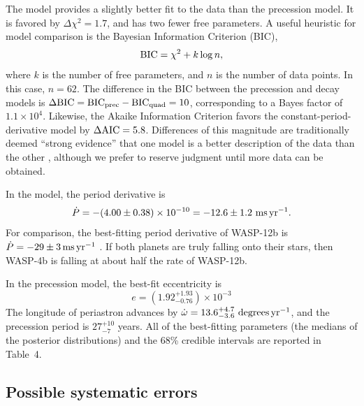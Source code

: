 \documentclass[12pt,twocolumn,tighten]{aastex62}
\begin{document}
{The  model provides a slightly
better fit to the data than the precession model.  It is favored by
$\Delta \chi^2 = 1.7$, and has two fewer free parameters.  A useful
heuristic for model comparison is the Bayesian Information Criterion
(BIC),
\begin{equation}
  {\rm BIC} = \chi^2 + k\log n,
\end{equation}
where $k$ is the number of free parameters, and $n$ is the number of
data points. In this case, $n=62$.  The difference in the BIC between
the precession and decay models is $\Delta {\rm BIC} = {\rm BIC}_{\rm
prec} - {\rm BIC}_{\rm quad} = 10$, corresponding to a Bayes factor of
$1.1\times 10^{4}$.  Likewise, the Akaike Information Criterion favors
the constant-period-derivative model by $\Delta {\rm AIC} = 5.8$.
Differences of this magnitude are traditionally deemed ``strong
evidence'' that one model is a better description of the data than the
other \citep{kass_bayes_1995}, although we prefer to reserve judgment
until more data can be obtained.

In the  model, the period
derivative is
\begin{equation}
\dot{P}
  = - (4.00 \pm 0.38)\times 10^{-10}
  = - 12.6 \pm 1.2~{\rm ms}\,{\rm yr}^{-1}.
  \label{eq:dP_dt_obs}
\end{equation}
For comparison, the best-fitting period derivative of WASP-12b is
$\dot{P} = -29 \pm 3\,{\rm ms}\,{\rm yr}^{-1}$
\citep{maciejewski_departure_2016,patra_2017}.  If both planets are
truly falling onto their stars, then WASP-4b is falling at about half
the rate of WASP-12b.

In the precession model, the best-fit eccentricity is
\begin{equation}
  e = (1.92^{+ 1.93}_{- 0.76})\times10^{-3}
  \label{eq:e_obs}
\end{equation}
The longitude of periastron advances by $\dot{\omega} =
13.6^{+4.7}_{-3.6}\ {\rm degrees}\,{\rm yr}^{-1}$, and the precession
period is $27^{+10}_{-7}$ years.  All of the best-fitting parameters
(the medians of the posterior distributions) and the 68\% credible
intervals are reported in Table~4.

\subsection{Possible systematic errors}

}
\end{document}
